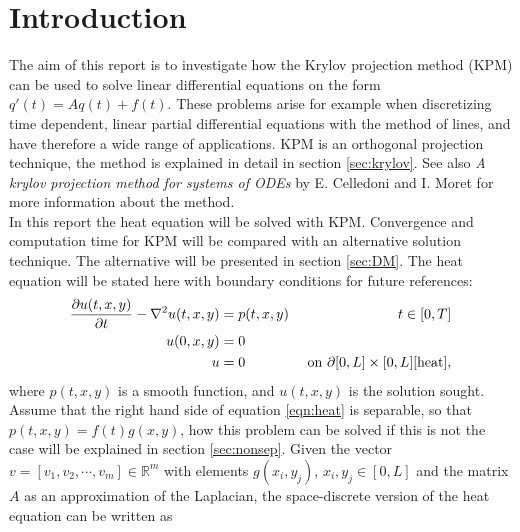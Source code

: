 \chapter{Introduction}%

The aim of this report is to investigate how the Krylov projection method (KPM)  can be used to solve linear differential equations on the form $q'(t)=Aq(t)+f(t)$. These problems arise for example when discretizing time dependent, linear partial differential equations with the method of lines, and have therefore a wide range of applications. 
KPM is an orthogonal projection technique, the method is explained in detail in section \ref{sec:krylov}. See also \textit{A krylov projection method for systems of ODEs} by E. Celledoni and I. Moret\cite{elena} for more information about the method. \\


In this report the heat equation will be solved with KPM. Convergence and computation time for KPM will be compared with an alternative solution technique. The alternative will be presented in section \ref{sec:DM}.
The heat equation will be stated here with boundary conditions for future references: \\
\begin{equation} \label{eqn:heat}
\begin{aligned}
\frac{\partial u(t,x,y)}{\partial t} - \nabla^2 u(t,x,y) &= p(t,x,y) & t \in [0,T]\\
u(0,x,y) &= 0 \\
u & = 0 			&\text{ on } \partial [0,L] \times [0,L]\cite{heat},
\end{aligned}
\end{equation}
where $p(t,x,y)$ is a smooth function, and $u(t,x,y)$ is the solution sought.\\

Assume that the right hand side of equation \eqref{eqn:heat} is separable, so that $p(t,x,y) = f(t)g(x,y) $, how this problem can be solved if this is not the case will be explained in section \ref{sec:nonsep}.
Given the vector $v = [v_1,v_2, \cdots, v_m] \in \mathbb{R}^m $ with elements $ g(x_i,y_j)$, $x_i,y_j \in [0,L]$ and the matrix $A$ as an approximation of the Laplacian, the space-discrete version of the heat equation can be written as

